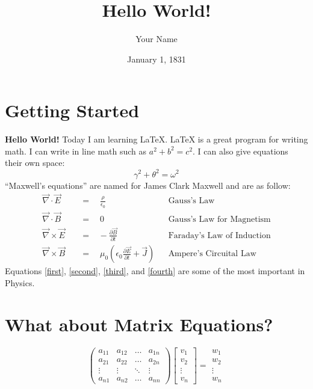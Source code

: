 \documentclass[]{article}
\title{Hello World!}
\author{Your Name}
\date{January 1, 1831}
\begin{document}
	\maketitle
	\section{Getting Started}
	\textbf{Hello World!} Today I am learning \LaTeX. \LaTeX{} is a great program for writing math. I can write in line math such as $a^2+b^2=c^2$. I can also give equations their own space: 
	\begin{equation} 
		\gamma^2+\theta^2=\omega^2
	\end{equation}
	``Maxwell's equations'' are named for James Clark Maxwell and are as follow:
	\begin{align}             
		\vec{\nabla} \cdot \vec{E} \quad &=\quad\frac{\rho}{\epsilon_0} &&\text{Gauss's Law} \label{first}\\      
		\vec{\nabla} \cdot \vec{B} \quad &=\quad 0 &&\text{Gauss's Law for Magnetism} \label{second}\\
		\vec{\nabla} \times \vec{E} \quad &=\hspace{10pt}-\frac{\partial{\vec{B}}}{\partial{t}} &&\text{Faraday's Law of Induction} \label{third}\\ 
		\vec{\nabla} \times \vec{B} \quad &=\quad \mu_0\left( \epsilon_0\frac{\partial{\vec{E}}}{\partial{t}}+\vec{J}\right) &&\text{Ampere's Circuital Law} \label{fourth}
	\end{align}
	Equations \ref{first}, \ref{second}, \ref{third}, and \ref{fourth} are some of the most important in Physics.
	\section{What about Matrix Equations?}
	\begin{equation*}
		\begin{pmatrix}
			a_{11}&a_{12}&\dots&a_{1n}\\
			a_{21}&a_{22}&\dots&a_{2n}\\
			\vdots&\vdots&\ddots&\vdots\\
			a_{n1}&a_{n2}&\dots&a_{nn}
		\end{pmatrix}
		\begin{bmatrix}
			v_{1}\\
			v_{2}\\
			\vdots\\
			v_{n}
		\end{bmatrix}
		=
		\begin{matrix}
			w_{1}\\
			w_{2}\\
			\vdots\\
			w_{n}
		\end{matrix}
	\end{equation*}
\end{document}
